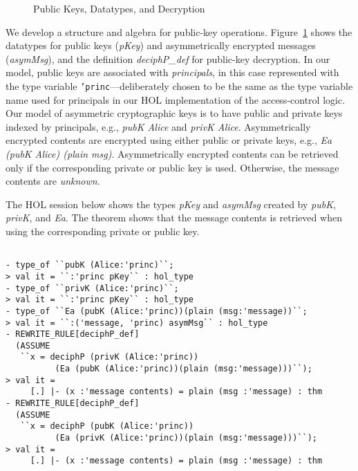 \begin{figure}[tb]
  \centering
  \begin{minipage}{1.0\linewidth}
    \HOLcipherDatatypespKey
    \HOLcipherDatatypesasymMsg
    \vspace*{-0.1in}
    \HOLcipherDefinitionsdeciphPXXdef
  \end{minipage}
  \caption{Public Keys, Datatypes, and Decryption}
  \label{fig:public-key}
\end{figure}

We develop a structure and algebra for public-key
operations. Figure~\ref{fig:public-key} shows the datatypes for public
keys (\emph{pKey}) and asymmetrically encrypted messages
(\emph{asymMsg}), and the definition \emph{deciphP\_def} for
public-key decryption. In our model, public keys are associated with
\emph{principals}, in this case represented with the type variable
\texttt{'princ}---deliberately chosen to be the same as the type
variable name used for principals in our HOL implementation of the
access-control logic. Our model of asymmetric cryptographic keys is to
have public and private keys indexed by principals, e.g., \emph{pubK
  Alice} and \emph{privK Alice}. Asymmetrically encrypted contents are
encrypted using either public or private keys, e.g., \emph{Ea (pubK
  Alice) (plain msg)}. Asymmetrically encrypted contents can be
retrieved only if the corresponding private or public key is
used. Otherwise, the message contents are \emph{unknown}.

The HOL session below shows the types \emph{pKey} and \emph{asymMsg}
created by \emph{pubK}, \emph{privK}, and \emph{Ea}.  The theorem
shows that the message contents is retrieved when using the
corresponding private or public key.
\begin{session}
  \begin{scriptsize}
\begin{verbatim}

- type_of ``pubK (Alice:'princ)``;
> val it = ``:'princ pKey`` : hol_type
- type_of ``privK (Alice:'princ)``;
> val it = ``:'princ pKey`` : hol_type
- type_of ``Ea (pubK (Alice:'princ))(plain (msg:'message))``;
> val it = ``:('message, 'princ) asymMsg`` : hol_type
- REWRITE_RULE[deciphP_def]
  (ASSUME
   ``x = deciphP (privK (Alice:'princ))
          (Ea (pubK (Alice:'princ))(plain (msg:'message)))``);
> val it =
     [.] |- (x :'message contents) = plain (msg :'message) : thm
- REWRITE_RULE[deciphP_def]
  (ASSUME
   ``x = deciphP (pubK (Alice:'princ))
          (Ea (privK (Alice:'princ))(plain (msg:'message)))``);
> val it =
     [.] |- (x :'message contents) = plain (msg :'message) : thm
\end{verbatim}
  \end{scriptsize}
\end{session}

